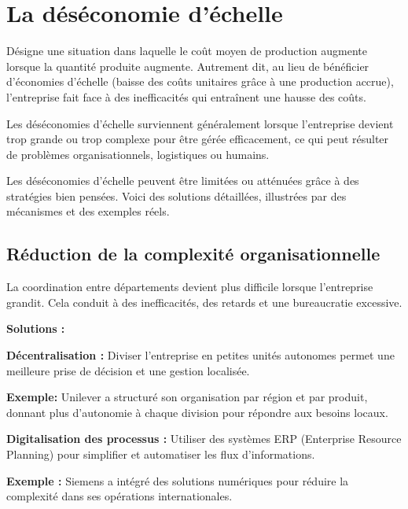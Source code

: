 \chapter*{La déséconomie d'échelle}
\setcounter{chapter}{1}
Désigne une situation dans laquelle le coût moyen de production augmente
lorsque la quantité produite augmente. Autrement dit, au lieu de bénéficier d'économies d'échelle (baisse
des coûts unitaires grâce à une production accrue), l'entreprise fait face à des inefficacités qui entraînent
une hausse des coûts.
\par
Les déséconomies d'échelle surviennent généralement lorsque l'entreprise devient trop grande ou trop
complexe pour être gérée efficacement, ce qui peut résulter de problèmes organisationnels, logistiques
ou humains.
\par
Les déséconomies d'échelle peuvent être limitées ou atténuées grâce à des stratégies bien pensées.
Voici des solutions détaillées, illustrées par des mécanismes et des exemples réels.
\setcounter{section}{1}
\section{Réduction de la complexité organisationnelle}
La coordination entre départements devient plus difficile lorsque l’entreprise grandit. Cela conduit à
des inefficacités, des retards et une bureaucratie excessive.
\par
\textbf{Solutions :} 
\par
\textbf{Décentralisation :} Diviser l’entreprise en petites unités autonomes permet une meilleure prise de
décision et une gestion localisée.
\par
\textbf{Exemple:} Unilever a structuré son organisation par région et par produit, donnant plus
d'autonomie à chaque division pour répondre aux besoins locaux.
\par
\textbf{Digitalisation des processus :} Utiliser des systèmes ERP (Enterprise Resource Planning) pour
simplifier et automatiser les flux d'informations.
\par
\textbf{Exemple :} Siemens a intégré des solutions numériques pour réduire la complexité dans
ses opérations internationales.
